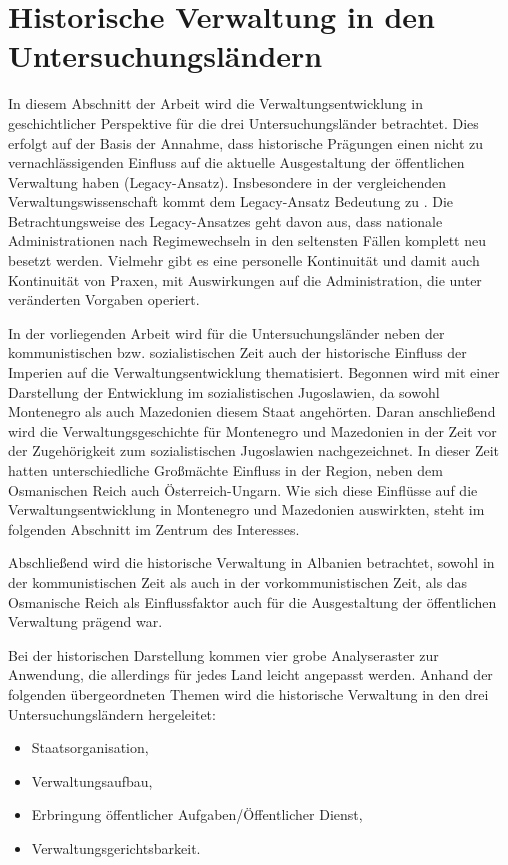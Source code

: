 \section{ Historische Verwaltung in den Untersuchungsländern }
In diesem Abschnitt der Arbeit wird die Verwaltungsentwicklung in geschichtlicher Perspektive für die drei Untersuchungsländer betrachtet. Dies erfolgt auf der Basis der Annahme, dass historische Prägungen einen nicht zu vernachlässigenden Einfluss auf die aktuelle Ausgestaltung der öffentlichen Verwaltung haben (Legacy-Ansatz). Insbesondere in der vergleichenden Verwaltungswissenschaft kommt dem Legacy-Ansatz Bedeutung zu \cite{kuhlmann03, kuhlwoll}. Die Betrachtungsweise des Legacy-Ansatzes geht davon aus, dass nationale Administrationen nach Regimewechseln in den seltensten Fällen komplett neu besetzt werden. Vielmehr gibt es eine personelle Kontinuität und damit auch Kontinuität von Praxen, mit Auswirkungen auf die Administration, die unter veränderten Vorgaben operiert.\par
In der vorliegenden Arbeit wird für die Untersuchungsländer neben der kommunistischen bzw. sozialistischen Zeit auch der historische Einfluss der Imperien auf die Verwaltungsentwicklung thematisiert. Begonnen wird mit einer Darstellung der Entwicklung im sozialistischen Jugoslawien, da sowohl Montenegro als auch Mazedonien diesem Staat angehörten. Daran anschließend wird die Verwaltungsgeschichte für Montenegro und Mazedonien in der Zeit vor der Zugehörigkeit zum sozialistischen Jugoslawien nachgezeichnet. In dieser Zeit hatten unterschiedliche Großmächte Einfluss in der Region, neben dem Osmanischen Reich auch Österreich-Ungarn. Wie sich diese Einflüsse auf die Verwaltungsentwicklung in Montenegro und Mazedonien auswirkten, steht im folgenden Abschnitt im Zentrum des Interesses.\par
Abschließend wird die historische Verwaltung in Albanien betrachtet, sowohl in der kommunistischen Zeit als auch in der vorkommunistischen Zeit, als das Osmanische Reich als Einflussfaktor auch für die Ausgestaltung der öffentlichen Verwaltung prägend war.\par
Bei der historischen Darstellung kommen vier grobe Analyseraster zur Anwendung, die allerdings für jedes Land leicht angepasst werden. Anhand der folgenden übergeordneten Themen wird die historische Verwaltung in den drei Untersuchungsländern hergeleitet:
\begin{itemize} \itemsep1pt \parskip0pt 
\item Staatsorganisation,
\item Verwaltungsaufbau,
\item Erbringung öffentlicher Aufgaben/Öffentlicher Dienst,
\item Verwaltungsgerichtsbarkeit.
\end{itemize}
